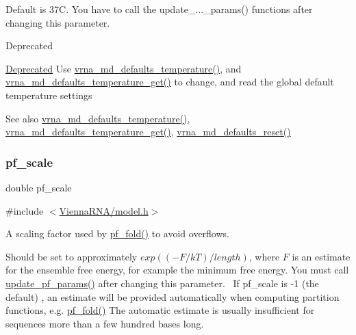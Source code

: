 Default is 37C. You have to call the update\+\_\+...\+\_\+params() functions after changing this parameter. \begin{DoxyRefDesc}{Deprecated}
\item[\mbox{\hyperlink{deprecated__deprecated000090}{Deprecated}}]Use \mbox{\hyperlink{group__model__details_gaf9e527e9a2f7e6fd6e42bc6e602f5445}{vrna\+\_\+md\+\_\+defaults\+\_\+temperature()}}, and \mbox{\hyperlink{group__model__details_ga96b24a74437f9ba46c4e06343155bf46}{vrna\+\_\+md\+\_\+defaults\+\_\+temperature\+\_\+get()}} to change, and read the global default temperature settings \end{DoxyRefDesc}
\begin{DoxySeeAlso}{See also}
\mbox{\hyperlink{group__model__details_gaf9e527e9a2f7e6fd6e42bc6e602f5445}{vrna\+\_\+md\+\_\+defaults\+\_\+temperature()}}, \mbox{\hyperlink{group__model__details_ga96b24a74437f9ba46c4e06343155bf46}{vrna\+\_\+md\+\_\+defaults\+\_\+temperature\+\_\+get()}}, \mbox{\hyperlink{group__model__details_ga70834424cf804d149937de89f80ceb45}{vrna\+\_\+md\+\_\+defaults\+\_\+reset()}} 
\end{DoxySeeAlso}
\mbox{\label{group__model__details_gad3b22044065acc6dee0af68931b52cfd}} 
\subsubsection{\texorpdfstring{pf\_scale}{pf\_scale}}
{\footnotesize\ttfamily double pf\+\_\+scale}



{\ttfamily \#include $<$\mbox{\hyperlink{model_8h}{Vienna\+R\+N\+A/model.\+h}}$>$}



A scaling factor used by \mbox{\hyperlink{group__part__func__global__deprecated_gadc3db3d98742427e7001a7fd36ef28c2}{pf\+\_\+fold()}} to avoid overflows. 

Should be set to approximately $exp{((-F/kT)/length)}$, where $F$ is an estimate for the ensemble free energy, for example the minimum free energy. You must call \mbox{\hyperlink{group__part__func__global__deprecated_ga384e927890f9c034ff09fa66da102d28}{update\+\_\+pf\+\_\+params()}} after changing this parameter.~\newline
If pf\+\_\+scale is -\/1 (the default) , an estimate will be provided automatically when computing partition functions, e.\+g. \mbox{\hyperlink{group__part__func__global__deprecated_gadc3db3d98742427e7001a7fd36ef28c2}{pf\+\_\+fold()}} The automatic estimate is usually insufficient for sequences more than a few hundred bases long. \mbox{\label{group__model__details_ga72b511ed1201f7e23ec437e468790d74}} 
